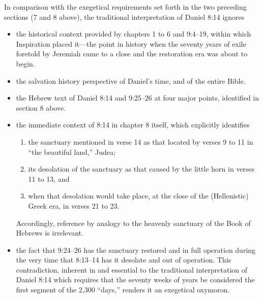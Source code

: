 In comparison with the exegetical requirements set forth in the two
preceding sections (7 and 8 above), the traditional interpretation of Daniel
8:14 ignores
\begin{itemize}
	\item the historical context provided by chapters 1 to 6 and 9:4--19, within
which Inspiration placed it---the point in history when the seventy years of
exile foretold by Jeremiah came to a close and the restoration era was
about to begin.
	\item the salvation history perspective of Daniel's time, and of the entire
Bible.
	\item the Hebrew text of Daniel 8:14 and 9:25--26 at four major points,
identified in section 8 above.
	\item the immediate context of 8:14 in chapter 8 itself, which explicitly
identifies
	\begin{enumerate}
		\item the sanctuary mentioned in verse 14 as that located by verses
9 to 11 in ``the beautiful land,'' Judea; 
		\item its desolation of the sanctuary
as that caused by the little horn in verses 11 to 13, and 
		\item when that
desolation would take place, at the close of the (Hellenistic) Greek era, in
verses 21 to 23.
	\end{enumerate}
	Accordingly, reference by analogy to the heavenly sanctuary
	of the Book of Hebrews is irrelevant.

	\item the fact that 9:24--26 has the sanctuary restored and in full operation
during the very time that 8:13--14 has it desolate and out of operation. This
contradiction, inherent in and essential to the traditional interpretation
of Daniel 8:14 which requires that the seventy weeks of years be considered
the first segment of the 2,300 ``days,'' renders it an exegetical oxymoron.
\end{itemize}

